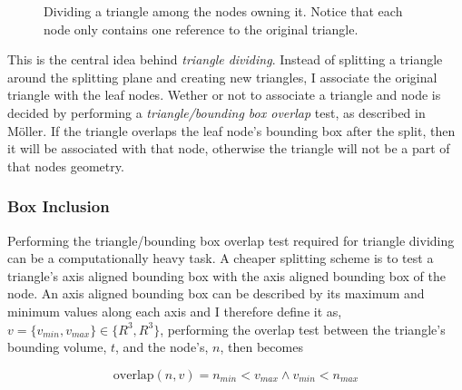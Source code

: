 \begin{figure}
  \centering
  
  \vspace{3mm}
  \parbox{5cm}{\caption[Dividing a triangle.]{Dividing a triangle
      among the nodes owning it. Notice that each node only contains
      one reference to the original triangle.}\label{fig:dividing}}
\end{figure}

This is the central idea behind \textit{triangle dividing}. Instead of
splitting a triangle around the splitting plane and creating new
triangles, I associate the original triangle with the leaf
nodes. Wether or not to associate a triangle and node is decided by
performing a \textit{triangle/bounding box overlap} test, as described
in Möller. If the triangle overlaps the leaf
node's bounding box after the split, then it will be associated with
that node, otherwise the triangle will not be a part of that nodes
geometry.


\subsubsection{Box Inclusion}\label{sec:boxInclusion}



Performing the triangle/bounding box overlap test required for
triangle dividing can be a computationally heavy task. A cheaper
splitting scheme is to test a triangle's axis aligned bounding box
with the axis aligned bounding box of the node. An axis aligned
bounding box can be described by its maximum and minimum values along
each axis and I therefore define it as, $v = \{v_{min}, v_{max}\} \in
\{R^3, R^3\}$, performing the overlap test between the triangle's
bounding volume, $t$, and the node's, $n$, then becomes

\begin{displaymath}
  \text{overlap}(n,v) = n_{min} < v_{max} \wedge v_{min} < n_{max}
\end{displaymath}

